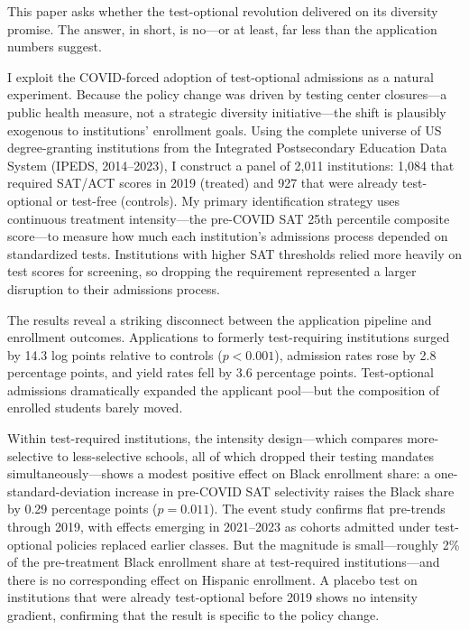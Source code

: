 \documentclass[12pt]{article}
\begin{document}
This paper asks whether the test-optional revolution delivered on its diversity promise. The answer, in short, is no---or at least, far less than the application numbers suggest.

I exploit the COVID-forced adoption of test-optional admissions as a natural experiment. Because the policy change was driven by testing center closures---a public health measure, not a strategic diversity initiative---the shift is plausibly exogenous to institutions' enrollment goals. Using the complete universe of US degree-granting institutions from the Integrated Postsecondary Education Data System (IPEDS, 2014--2023), I construct a panel of 2,011 institutions: 1,084 that required SAT/ACT scores in 2019 (treated) and 927 that were already test-optional or test-free (controls). My primary identification strategy uses continuous treatment intensity---the pre-COVID SAT 25th percentile composite score---to measure how much each institution's admissions process depended on standardized tests. Institutions with higher SAT thresholds relied more heavily on test scores for screening, so dropping the requirement represented a larger disruption to their admissions process.

The results reveal a striking disconnect between the application pipeline and enrollment outcomes. Applications to formerly test-requiring institutions surged by 14.3 log points relative to controls ($p < 0.001$), admission rates rose by 2.8 percentage points, and yield rates fell by 3.6 percentage points. Test-optional admissions dramatically expanded the applicant pool---but the composition of enrolled students barely moved.

Within test-required institutions, the intensity design---which compares more-selective to less-selective schools, all of which dropped their testing mandates simultaneously---shows a modest positive effect on Black enrollment share: a one-standard-deviation increase in pre-COVID SAT selectivity raises the Black share by 0.29 percentage points ($p = 0.011$). The event study confirms flat pre-trends through 2019, with effects emerging in 2021--2023 as cohorts admitted under test-optional policies replaced earlier classes. But the magnitude is small---roughly 2\% of the pre-treatment Black enrollment share at test-required institutions---and there is no corresponding effect on Hispanic enrollment. A placebo test on institutions that were already test-optional before 2019 shows no intensity gradient, confirming that the result is specific to the policy change.
\end{document}
